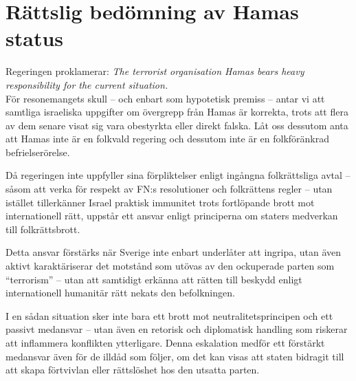 



\section{Rättslig bedömning av Hamas status}
Regeringen proklamerar:
\textit{The terrorist organisation Hamas bears heavy responsibility for the current situation. }\\

För resonemangets skull – och enbart som hypotetisk premiss – antar vi att samtliga israeliska uppgifter om övergrepp från Hamas är korrekta, trots att flera av dem senare visat sig vara obestyrkta eller direkt falska.
Låt oss dessutom anta att Hamas inte är en folkvald regering och dessutom inte är en folkföränkrad befrielserörelse.


Då regeringen inte uppfyller sina förpliktelser enligt ingångna folkrättsliga avtal – såsom att verka för respekt av FN:s resolutioner och folkrättens regler – utan istället tillerkänner Israel praktisk immunitet trots fortlöpande brott mot internationell rätt, uppstår ett ansvar enligt principerna om staters medverkan till folkrättsbrott.

Detta ansvar förstärks när Sverige inte enbart underlåter att ingripa, utan även aktivt karaktäriserar det motstånd som utövas av den ockuperade parten som ``terrorism'' – utan att samtidigt erkänna att rätten till beskydd enligt internationell humanitär rätt nekats den befolkningen.

I en sådan situation sker inte bara ett brott mot neutralitetsprincipen och ett passivt medansvar – utan även en retorisk och diplomatisk handling som riskerar att inflammera konflikten ytterligare. Denna eskalation medför ett förstärkt medansvar även för de illdåd som följer, om det kan visas att staten bidragit till att skapa förtvivlan eller rättslöshet hos den utsatta parten.


